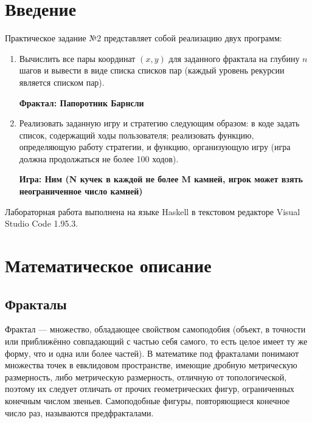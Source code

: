 \documentclass[11pt,a4paper,final]{article} %
\begin{document}
\newpage

\tableofcontents

\newpage
\section*{Введение}
Практическое задание №2 представляет собой реализацию двух программ:

\begin{enumerate}
	\item Вычислить все пары координат \((x, y)\) для заданного фрактала на глубину \(n\) шагов и вывести в виде списка списков пар (каждый уровень рекурсии является списком пар).
	
	\begin{center}
	\textbf{Фрактал: Папоротник Барнсли}
	\end{center}
	
	\item Реализовать заданную игру и стратегию следующим образом: в коде задать список, содержащий ходы пользователя; реализовать функцию, определяющую работу стратегии, и функцию, организующую игру (игра должна продолжаться не более 100 ходов).
	
	\begin{center}
		\textbf{Игра: Ним (N кучек в каждой не более M камней, игрок может взять неограниченное число камней)}
	\end{center}
	
\end{enumerate}

\par Лабораторная работа выполнена на языке Haskell в текстовом редакторе Visual Studio Code 1.95.3.


\newpage
\section{Математическое описание}
 \subsection{Фракталы}
Фрактал — множество, обладающее свойством самоподобия (объект, в точности или приближённо совпадающий с частью себя самого, то есть целое имеет ту же форму, что и одна или более частей). В математике под фракталами понимают множества точек в евклидовом пространстве, имеющие дробную метрическую размерность, либо метрическую размерность, отличную от топологической, поэтому их следует отличать от прочих геометрических фигур, ограниченных конечным числом звеньев. Самоподобные фигуры, повторяющиеся конечное число раз, называются предфракталами.
\end{document}
